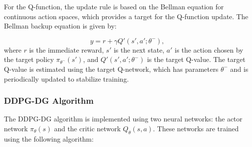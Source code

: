 \documentclass[conference]{IEEEtran}
\begin{document}
For the Q-function, the update rule is based on the Bellman equation for continuous action spaces, which provides a target for the Q-function update. The Bellman backup equation is given by:

\begin{equation}
    y = r + \gamma Q'(s', a'; \theta^-),
\end{equation}
where \( r \) is the immediate reward, \( s' \) is the next state, \( a' \) is the action chosen by the target policy \( \pi_{\theta^-}(s') \), and \( Q'(s', a'; \theta^-) \) is the target Q-value. The target Q-value is estimated using the target Q-network, which has parameters \( \theta^- \) and is periodically updated to stabilize training.

\subsubsection{DDPG-DG Algorithm}

The DDPG-DG algorithm is implemented using two neural networks: the actor network \( \pi_{\theta}(s) \) and the critic network \( Q_{\theta}(s, a) \). These networks are trained using the following algorithm:
\end{document}
